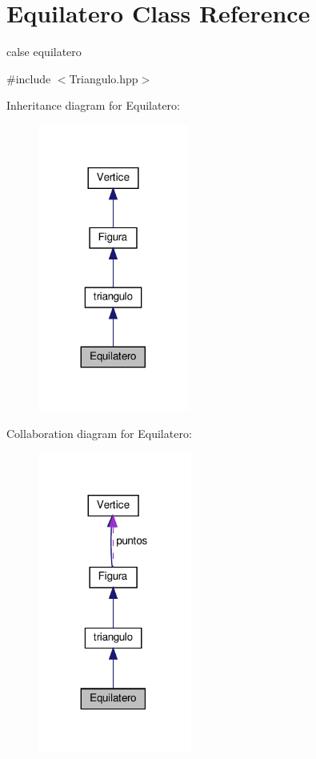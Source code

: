 \hypertarget{class_equilatero}{}\section{Equilatero Class Reference}
\label{class_equilatero}


calse equilatero  




{\ttfamily \#include $<$Triangulo.\+hpp$>$}



Inheritance diagram for Equilatero\+:
\nopagebreak
\begin{figure}[H]
\begin{center}
\leavevmode
\includegraphics[width=140pt]{class_equilatero__inherit__graph}
\end{center}
\end{figure}


Collaboration diagram for Equilatero\+:
\nopagebreak
\begin{figure}[H]
\begin{center}
\leavevmode
\includegraphics[width=143pt]{class_equilatero__coll__graph}
\end{center}
\end{figure}
